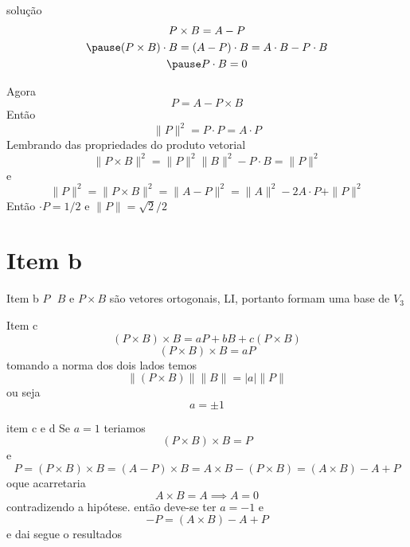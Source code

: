 \documentclass{beamer}
\begin{document}
\begin{frame}{solução}
\begin{gather*}
  P\times B = A-P \\ \pause 
  (P\times B)\cdot B = (A-P)\cdot B = A\cdot B - P\cdot B \\ \pause 
  P\cdot B = 0
\end{gather*}
\end{frame}

\begin{frame}
  Agora 
  $$ P = A-P\times B $$
  \pause 
  Então
  $$ \|P\|^2 =P\cdot P = A\cdot P $$
\pause 
Lembrando das propriedades do produto vetorial 
$$ \|P\times B\|^2 = \|P\|^2 \|B\|^2 - P\cdot B=\| P \|^2 $$ e
$$ \|P\|^2 = \|P\times B\|^2 = \|A-P\|^2 = \|A\|^2 -2A\cdot P +\|P\|^2 $$
Então $ \cdot P=1/2$ e $\|P\|=\sqrt{2}/2$
\end{frame}

\section{Item b}

\begin{frame}{Item b}
  $P \text{ }B$ e $P\times B$ são vetores ortogonais, LI, portanto formam 
  uma base de $V_3$
\end{frame}

\begin{frame}{Item c}
 $$ (P\times B)\times B = aP+ bB +c(P\times B) $$
 \pause 
 $$ (P\times B)\times B = aP $$
 \pause 
 tomando a norma dos dois lados temos
 $$\|(P\times B)\|\| B \|= |a| \|P\|$$
 ou seja
 $$ a = \pm 1$$
 

\end{frame}

\begin{frame}{item c e d}
  Se $a=1$ teriamos 
  $$(P\times B)\times B=P$$ e
  $$P=(P\times B)\times B= (A-P)\times B = A\times B - (P\times B) = (A\times B) -A +P$$
  oque acarretaria
  $$ A\times B = A \implies A=0$$ 
  contradizendo a hipótese.
\pause
então deve-se ter $a=-1$ e
$$-P = (A\times B) -A +P$$
e dai segue o resultados
\end{frame}
\end{document}
